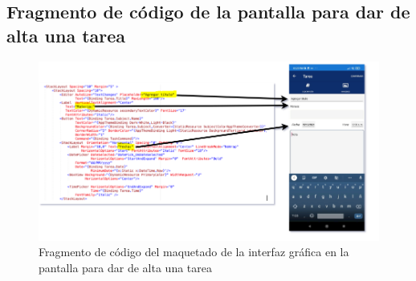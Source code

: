 \documentclass[10pt]{article}
\begin{document}
\subsection{Fragmento de código de la pantalla para dar de alta una tarea}
\begin{figure}[H]
    \begin{center}
    \includegraphics[width=1\textwidth]{Imagenes/tareas.png}
    \caption{Fragmento de código del maquetado de la interfaz gráfica en la pantalla para dar de alta una tarea}
\label{fig1}
    \end{center}
\end{figure} 
\end{document}
